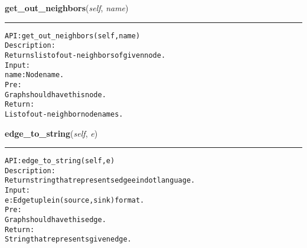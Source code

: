     \label{coinor:gimpy:graph:Graph:get_out_neighbors}

    \vspace{0.5ex}

\hspace{.8\funcindent}\begin{boxedminipage}{\funcwidth}

    \raggedright \textbf{get\_out\_neighbors}(\textit{self}, \textit{name})

    \vspace{-1.5ex}

    \rule{\textwidth}{0.5\fboxrule}
\setlength{\parskip}{2ex}
\begin{alltt}

API: get\_out\_neighbors(self, name)
Description:
Returns list of out-neighbors of given node.
Input:
    name: Node name.
Pre:
    Graph should have this node.
Return:
    List of out-neighbor node names.
\end{alltt}

\setlength{\parskip}{1ex}
    \end{boxedminipage}

    \label{coinor:gimpy:graph:Graph:edge_to_string}

    \vspace{0.5ex}

\hspace{.8\funcindent}\begin{boxedminipage}{\funcwidth}

    \raggedright \textbf{edge\_to\_string}(\textit{self}, \textit{e})

    \vspace{-1.5ex}

    \rule{\textwidth}{0.5\fboxrule}
\setlength{\parskip}{2ex}
\begin{alltt}

API: edge\_to\_string(self, e)
Description:
Return string that represents edge e in dot language.
Input:
    e: Edge tuple in (source,sink) format.
Pre:
    Graph should have this edge.
Return:
    String that represents given edge.
\end{alltt}

\setlength{\parskip}{1ex}
    \end{boxedminipage}

